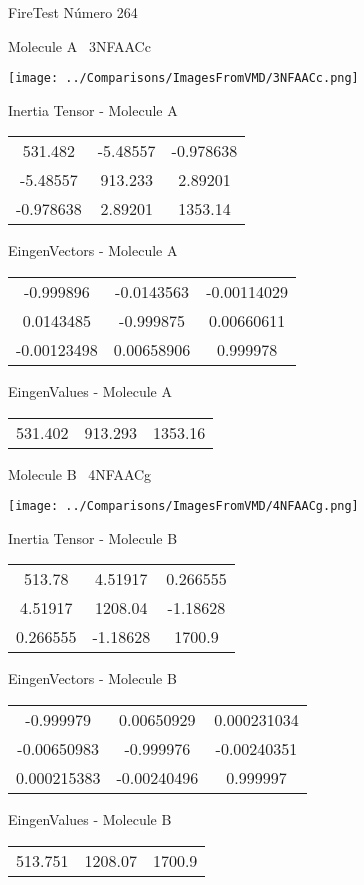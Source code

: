 \vtab[-3cm]
\begin{center}
{\large FireTest \tab Número 264}
\end{center}
\begin{multicols}{2}
\begin{center}

Molecule A \
3NFAACc

\texttt{[image: ../Comparisons/ImagesFromVMD/3NFAACc.png]}

Inertia Tensor - Molecule A \\
\begin{tabular}{|c c c|}
531.482	 & 	-5.48557	 & 	-0.978638	 \\
-5.48557	 & 	913.233	 & 	2.89201	 \\
-0.978638	 & 	2.89201	 & 	1353.14
\end{tabular}

\vtab
 EingenVectors - Molecule A     \\
\begin{tabular}{|c c c|}
-0.999896	 & 	-0.0143563	 & 	-0.00114029	 \\
0.0143485	 & 	-0.999875	 & 	0.00660611	 \\
-0.00123498	 & 	0.00658906	 & 	0.999978
\end{tabular}

\vtab
 EingenValues - Molecule A     \\
\begin{tabular}{|c c c|}
531.402	 & 	913.293	 & 	1353.16	 \\
\end{tabular}
\columnbreak

Molecule B \
4NFAACg

\texttt{[image: ../Comparisons/ImagesFromVMD/4NFAACg.png]}

Inertia Tensor - Molecule B \\
\begin{tabular}{|c c c|}
513.78	 & 	4.51917	 & 	0.266555	 \\
4.51917	 & 	1208.04	 & 	-1.18628	 \\
0.266555	 & 	-1.18628	 & 	1700.9
\end{tabular}

\vtab
 EingenVectors - Molecule B     \\
\begin{tabular}{|c c c|}
-0.999979	 & 	0.00650929	 & 	0.000231034	 \\
-0.00650983	 & 	-0.999976	 & 	-0.00240351	 \\
0.000215383	 & 	-0.00240496	 & 	0.999997
\end{tabular}

\vtab
 EingenValues - Molecule B     \\
\begin{tabular}{|c c c|}
513.751	 & 	1208.07	 & 	1700.9	 \\
\end{tabular}

\end{center}
\end{multicols}

